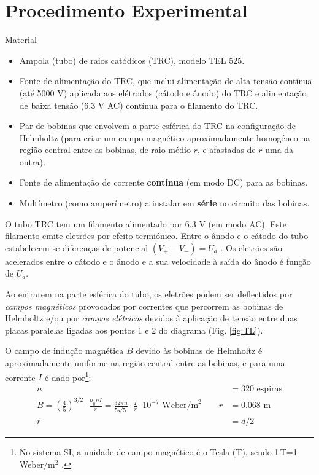 \documentclass[a4paper,twoside,12pt]{article}      %
\begin{document}
\section{\sf Procedimento Experimental}
{ \large Material }
\begin{itemize}
	\item Ampola (tubo) de raios catódicos (TRC), modelo TEL 525.
	\item 	Fonte de alimentação do TRC, que inclui alimentação de alta tensão contínua 
	(até 5000 V) aplicada aos elétrodos (cátodo e ânodo) do TRC e alimentação de baixa tensão
	(6.3 V AC) contínua para o filamento do TRC.
	\item Par de bobinas que envolvem a parte esférica do TRC na configuração de
	Helmholtz (para criar um campo magnético aproximadamente homogéneo na
	região central entre as bobinas, de raio médio $r$, e afastadas de $r$ uma da outra).
	\item Fonte de alimentação de corrente \textbf{contínua} (em modo DC) para as bobinas.
	\item Multímetro (como amperímetro) a instalar em \textbf{série} no circuito das bobinas.
\end{itemize}

O tubo TRC tem um filamento alimentado por 6.3 V (em modo AC). Este filamento emite eletrões por efeito termiónico. 
Entre o ânodo e o cátodo do tubo estabelecem-se diferenças de potencial $ (V_+ - V_-) = U_a$ . Os eletrões são acelerados entre o cátodo e o ânodo e a sua velocidade à saída do ânodo é função de $U_a$. 

Ao entrarem na parte esférica do tubo, os eletrões podem ser deflectidos por \emph{campos magnéticos} provocados por correntes que percorrem as bobinas de Helmholtz e/ou por \emph{campos elétricos} devidos à aplicação de tensão entre duas placas paralelas ligadas aos pontos 1 e 2 do diagrama (Fig. \ref{fig:TL}).

O campo de indução magnética $B$ devido às bobinas de Helmholtz é aproximadamente uniforme na região central entre as bobinas, e para uma corrente $I$ é dado por\footnote{No sistema SI, a unidade de campo magnético é o Tesla (T), sendo 1\,T=1\,Weber/m$^{2}$ .}:
\begin{align}
	\label{eq:helmotz}
	 n &= 320\textrm{ espiras} \nonumber \\ 
B = \left(\frac{4}{5}\right)^{3/2} \cdot \frac{\mu_0 n I}{r} =  \frac{32 \pi n }{5 \sqrt{5}} \cdot \frac{I}{r} \cdot 10^{-7}\textrm{ Weber/m}^{2}
 \qquad  r  &= 0.068\textrm{ m} \\
r  &= d/2 \nonumber
\end{align}
\end{document}

